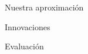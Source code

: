 \documentclass{beamer}
\begin{document}
	\begin{frame}{Nuestra aproximación}
	\end{frame}
	\begin{frame}{Innovaciones}
	\end{frame}
	\begin{frame}{Evaluación}
	\end{frame}

\end{document}

